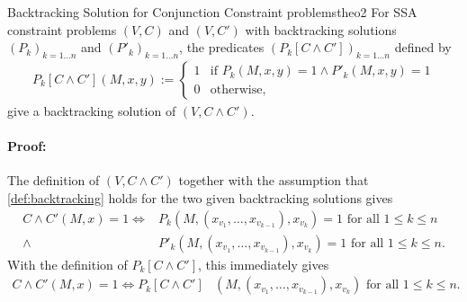 \begin{theorem}{Backtracking Solution for Conjunction Constraint problems}{theo2}
    For SSA constraint problems $(V,C)$ and $(V,C')$ with backtracking
    solutions $(P_k)_{k=1\dots n}$ and $(P'_k)_{k=1\dots n}$, the
    predicates $(P_k[C\mathrel\land C'])_{k=1\dots n}$ defined by
    \begin{align*}
        P_k[C\mathrel\land C'](M,x,y):=\left\{
            \begin{array}{ll}
                1&\text{if }P_k(M,x,y)=1\mathrel\land P'_k(M,x,y)=1\\
                0&\text{otherwise},
            \end{array}\right.
    \end{align*}
    give a backtracking solution of $(V,C\mathrel\land C')$.
    \tcblower
    \paragraph*{Proof:}
    The definition of $(V,C\mathrel\land C')$ together with the
    assumption that \autoref{def:backtracking} holds for the two given
    backtracking solutions gives
    \begin{align*}
        C\mathrel\land C'(M,x)=1\iff{}& P_k(M,(x_{v_1},\dots,x_{v_{k-1}}),x_{v_k})=1\text{ for all }1\leq k\leq n\\
                              \mathrel\land{}& P'_k(M,(x_{v_1},\dots,x_{v_{k-1}}),x_{v_k})=1\text{ for all }1\leq k\leq n.
    \end{align*}
    With the definition of $P_k[C\mathrel\land C']$, this immediately gives
    \begin{align*}
        C\mathrel\land C'(M,x)=1\iff P_k[C\mathrel\land C']&(M,(x_{v_1},\dots,x_{v_{k-1}}),x_{v_k})\text{ for all }1\leq k\leq n.
    \end{align*}
\end{theorem}
